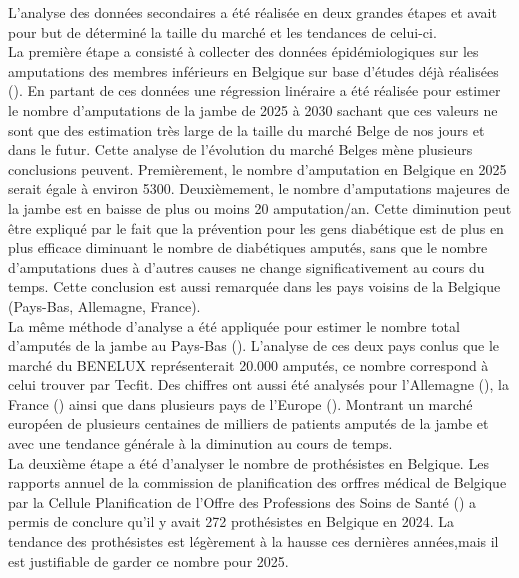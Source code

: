 L'analyse des données secondaires a été réalisée en deux grandes étapes et avait pour but de déterminé la taille du marché et les tendances de celui-ci. \\ La première étape a consisté à collecter des données épidémiologiques sur les amputations des membres inférieurs en Belgique sur base d'études déjà réalisées (\cite{ref:claessen,ref:amputations-be}).
 En partant de ces données une régression linéraire a été réalisée pour estimer le nombre d'amputations de la jambe de 2025 à 2030 sachant que ces valeurs ne sont que des estimation très large de la taille du marché Belge de nos jours et dans le futur.  
Cette analyse de l'évolution du marché Belges mène plusieurs conclusions peuvent. Premièrement, le nombre d'amputation en Belgique en 2025 serait égale à environ 5300. Deuxièmement, le nombre d'amputations majeures de la jambe est en baisse de plus ou moins 20 amputation/an. Cette diminution peut être expliqué par le fait que la prévention pour les gens diabétique est de plus en plus efficace diminuant le nombre de diabétiques amputés, sans que le nombre d'amputations dues à d'autres causes ne change significativement au cours du temps. Cette conclusion est aussi remarquée dans les pays voisins de la Belgique (Pays-Bas, Allemagne, France).
\\ La même méthode d'analyse a été appliquée pour estimer le nombre total d'amputés de la jambe au Pays-Bas (\cite{ref:amputations-nl}).
L'analyse de ces deux pays conlus que le marché du BENELUX représenterait 20.000 amputés, ce nombre correspond à celui trouver par Tecfit. 
Des chiffres ont aussi été analysés pour l'Allemagne (\cite{ref:amputations-de}), la France (\cite{ref:amputations-fr}) ainsi que dans plusieurs pays de l'Europe (\cite{ref:amputations-eu1,ref:amputations-eu2}). 
Montrant un marché européen de plusieurs centaines de milliers de patients amputés de la jambe et avec une tendance générale à la diminution au cours de temps.
\vspace{1cm}
\\La deuxième étape a été d'analyser le nombre de prothésistes en Belgique. Les rapports annuel de la commission de planification des orffres médical de Belgique par la Cellule Planification de l'Offre des Professions des Soins de Santé (\cite{ref:prothesistes-be1,ref:prothesistes-be2}) a permis de conclure qu'il y avait 272 prothésistes en Belgique en 2024. 
La tendance des prothésistes est légèrement à la hausse ces dernières années,mais il est justifiable de garder ce nombre pour 2025.

